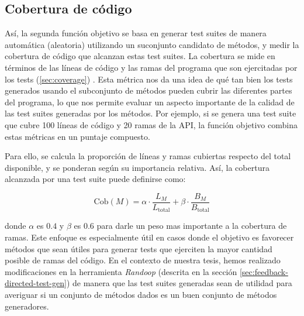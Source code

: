 \subsection{Cobertura de código}
\label{sec:fitnessRandoop}

 Así, la segunda función objetivo se basa en generar test suites
de manera automática (aleatoria) utilizando un suconjunto candidato de métodos,  
y medir la cobertura de código que alcanzan estas test suites. 
La cobertura se mide en términos de las líneas de código y las ramas del
programa que son ejercitadas por los tests (\ref{sec:coverage}) .
Esta métrica nos da una idea de qué tan bien los tests generados usando el
subconjunto de métodos pueden cubrir las diferentes partes del programa, 
lo que nos permite evaluar un aspecto importante de la calidad de las test
suites generadas por los métodos.
Por ejemplo, si se genera una test suite que cubre 100 líneas de código y 20 ramas de la API, 
la función objetivo combina estas métricas en un puntaje compuesto.

Para ello, se calcula la proporción de líneas y ramas cubiertas respecto del total disponible, 
y se ponderan según su importancia relativa. Así, la cobertura alcanzada por una
test suite puede definirse como:

\[
\text{Cob}(M) = \alpha \cdot \frac{L_M}{L_{\text{total}}} + \beta \cdot \frac{B_M}{B_{\text{total}}}
\]

donde $\alpha$ es $0.4$ y $\beta$ es $0.6$ para darle un peso mas importante a la cobertura de ramas.
Este enfoque es especialmente útil en casos donde el objetivo es favorecer
métodos que sean útiles para generar tests que ejerciten la mayor cantidad
posible de ramas del código.
En el contexto de nuestra tesis, hemos realizado modificaciones en la
herramienta \emph{Randoop} (descrita en la sección
\ref{sec:feedback-directed-test-gen})
de manera que las test suites generadas sean de utilidad para averiguar si un conjunto de 
métodos dados es un buen conjunto de métodos generadores.

